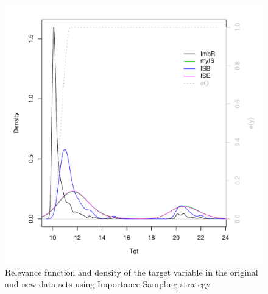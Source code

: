 \documentclass[10pt,a4paper]{article}\usepackage[]{graphicx}\usepackage[]{color}
\makeatletter
\def\maxwidth{ %
  \ifdim\Gin@nat@width>\linewidth
    \linewidth
  \else
    \Gin@nat@width
  \fi
}
\newenvironment{knitrout}{}{} %
\makeatother
\begin{document}
\begin{knitrout}\footnotesize
{}\color{fgcolor}\begin{figure}

{\centering \includegraphics[width=\maxwidth]{figures/UBL-IS_plot1-1} 

}

\caption[Relevance function and density of the target variable in the original and new data sets using Importance Sampling strategy]{Relevance function and density of the target variable in the original and new data sets using Importance Sampling strategy.}\label{fig:IS_plot1}
\end{figure}


\end{knitrout}
\end{document}
